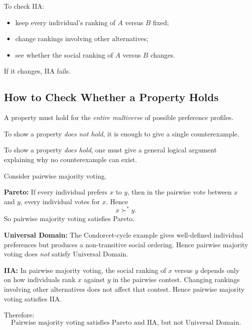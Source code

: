 \begin{examtip}
To check IIA:
\begin{itemize}
    \item keep every individual's ranking of $A$ versus $B$ fixed;
    \item change rankings involving other alternatives;
    \item see whether the social ranking of $A$ versus $B$ changes.
\end{itemize}
If it changes, IIA fails.
\end{examtip}

\subsection{How to Check Whether a Property Holds}

A property must hold for the \emph{entire multiverse} of possible preference profiles.

\begin{examtip}[title={Method Pattern: verifying SDM properties}]
To show a property \emph{does not hold}, it is enough to give a single counterexample.

To show a property \emph{does hold}, one must give a general logical argument explaining why no counterexample can exist.
\end{examtip}

\begin{examplebox}[title={Worked Example: Pairwise majority voting and the three properties}]
Consider pairwise majority voting.

\textbf{Pareto:} If every individual prefers $x$ to $y$, then in the pairwise vote between $x$ and $y$, every individual votes for $x$. Hence
\[
x \succ^* y.
\]
So pairwise majority voting satisfies Pareto.

\textbf{Universal Domain:} The Condorcet-cycle example gives well-defined individual preferences but produces a non-transitive social ordering. Hence pairwise majority voting does \emph{not} satisfy Universal Domain.

\textbf{IIA:} In pairwise majority voting, the social ranking of $x$ versus $y$ depends only on how individuals rank $x$ against $y$ in the pairwise contest. Changing rankings involving other alternatives does not affect that contest. Hence pairwise majority voting satisfies IIA.

Therefore:
\[
\boxed{\text{Pairwise majority voting satisfies Pareto and IIA, but not Universal Domain.}}
\]
\end{examplebox}

